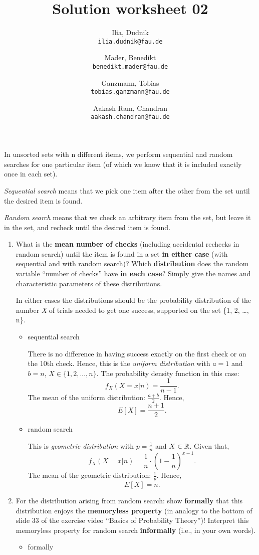 \documentclass{homework}
\title{Solution worksheet 02}
\author{
  Ilia, Dudnik \\
  \texttt{ilia.dudnik@fau.de}
  \and
  Mader, Benedikt\\
  \texttt{benedikt.mader@fau.de}
  \and
  Ganzmann, Tobias\\
  \texttt{tobias.ganzmann@fau.de}
  \and
  Aakash Ram, Chandran\\
  \texttt{aakash.chandran@fau.de}
}
\begin{document}
\maketitle

\exercise
In unsorted sets with n different items, we perform sequential and random searches for one particular item (of which we know that it is included exactly once in each set).

\emph{Sequential search} means that we pick one item after the other from the set until the desired item is found.

\emph{Random search} means that we check an arbitrary item from the set, but leave it in the set, and recheck until the desired item is found.

\begin{enumerate}
	\item What is the \textbf{mean number of checks} (including accidental rechecks in random search) until the item is found in a set \textbf{in either case} (with sequential and with random search)? Which \textbf{distribution} does the random variable “number of checks” have \textbf{in each case}? Simply give the names and characteristic parameters of these distributions.

	In either cases the distributions should be the probability distribution of the number \emph{X} of trials needed to get one success, supported on the set \{1, 2, \dots, n\}.	
	\begin{itemize}
		\item sequential search
		
		There is no difference in having success exactly on the first check or on the 10th check. Hence, this is the \emph{uniform distribution} with $a = 1$ and $b = n$, $X \in \{1, 2, ..., n\}$. The probability density function in this case: \[f_X(X = x|n) = \frac{1}{n-1}.\]
		The mean of the uniform distribution: $\frac{a+b}{2}$. Hence, \[E[X] = \frac{n+1}{2}.\]
		\item random search

		This is \emph{geometric distribution} with $p = \frac{1}{n}$ and $X \in \mathbb R$. Given that, \[f_X(X = x|n) = \frac{1}{n}\cdot (1 - \frac{1}{n}) ^ {x - 1}.\]
		The mean of the geometric distribution: $\frac{1}{p}$. Hence, \[E[X] = n.\]
	\end{itemize}
	\item For the distribution arising from random search: show \textbf{formally} that this distribution enjoys the \textbf{memoryless property} (in analogy to the bottom of slide 33 of the exercise video “Basics of Probability Theory”)! Interpret this memoryless property for random search \textbf{informally} (i.e., in your own words).
	\begin{itemize}
		\item formally


\end{itemize}
\end{enumerate}
\end{document}
